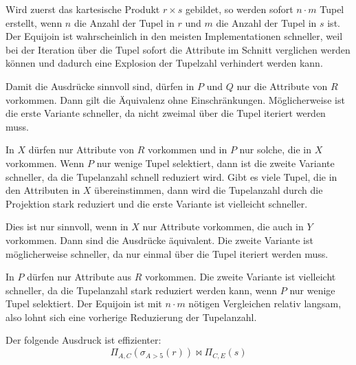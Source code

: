 \documentclass[a4paper,11pt]{article}             %
\begin{document}
\setcounter{excnt}{17}
\begin{ex}
  \begin{exlist}
    \leavevmode
  \item Wird zuerst das kartesische Produkt $r\times s$ gebildet, so werden
    sofort $n\cdot m$ Tupel erstellt, wenn $n$ die Anzahl der Tupel in $r$ und
    $m$ die Anzahl der Tupel in $s$ ist. Der Equijoin ist wahrscheinlich in den
    meisten Implementationen schneller, weil bei der Iteration über die Tupel
    sofort die Attribute im Schnitt verglichen werden können und dadurch eine
    Explosion der Tupelzahl verhindert werden kann.
   
  \item  
    \begin{exlist}
    \item Damit die Ausdrücke sinnvoll sind, dürfen in $P$ und $Q$ nur die
      Attribute von $R$ vorkommen. Dann gilt die Äquivalenz ohne
      Einschränkungen. Möglicherweise ist die erste Variante schneller, da nicht
      zweimal über die Tupel iteriert werden muss.
    \item In $X$ dürfen nur Attribute von $R$ vorkommen und in $P$ nur solche,
      die in $X$ vorkommen. Wenn $P$ nur wenige Tupel selektiert, dann ist die
      zweite Variante schneller, da die Tupelanzahl schnell reduziert wird. Gibt
      es viele Tupel, die in den Attributen in $X$ übereinstimmen, dann wird die
      Tupelanzahl durch die Projektion stark reduziert und die erste Variante
      ist vielleicht schneller.
    \item Dies ist nur sinnvoll, wenn in $X$ nur Attribute vorkommen, die auch
      in $Y$ vorkommen. Dann sind die Ausdrücke äquivalent. Die zweite Variante
      ist möglicherweise schneller, da nur einmal über die Tupel iteriert werden muss.
    \item In $P$ dürfen nur Attribute aus $R$ vorkommen. Die zweite Variante ist
      vielleicht schneller, da die Tupelanzahl stark reduziert werden kann, wenn
      $P$ nur wenige Tupel selektiert. Der Equijoin ist mit $n\cdot m$ nötigen
      Vergleichen relativ langsam, also lohnt sich eine vorherige Reduzierung
      der Tupelanzahl.
    \end{exlist}
  \item Der folgende Ausdruck ist effizienter:
    \begin{equation*}
     \Pi_{A,C}(\sigma_{A>5}(r))\bowtie\Pi_{C,E}(s)
    \end{equation*}
  \end{exlist}
\end{ex}
\end{document}
